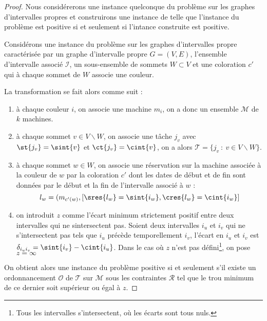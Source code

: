 \documentclass[a4paper,9pt]{book}
\begin{document}
\begin{proof}
    Nous considérerons une instance quelconque du problème \precolor sur les graphes d'intervalles
    propres et construirons une instance de \fischedpi telle que l'instance du problème \precolor
    est positive si et seulement si l'intance construite est positive.

    Considérons une instance du problème \precolor sur les graphes d'intervalles propre caractérisée
    par un graphe d'intervalle propre $G = (V,E)$, l'ensemble d'intervalle associé $\mathcal{I}$, un
    sous-ensemble de sommets $W \subset V$ et une coloration $c'$ qui à chaque sommet de $W$ associe
    une couleur. 
    
    La transformation se fait alors comme suit : 
    \begin{enumerate}
        \item à chaque couleur $i$, on associe une machine $m_i$, on a donc un ensemble
            $\mathcal{M}$ de $k$ machines.
        \item à chaque sommet $v \in V \backslash W$, on associe une tâche $j_v$ avec $\st{j_v} =
            \sint{v}$ et $\ct{j_v} = \cint{v}$, on a alors $\mathcal{T} = \{j_v\ \colon\ v \in V
            \backslash W\}$.
        \item à chaque sommet $w \in W$, on associe une réservation sur la machine associée à la
            couleur de $w$ par la coloration $c'$ dont les dates de début et de fin sont données par
            le début et la fin de l'intervalle associé à $w$ : \[
                l_w = (m_{c'(w)}, [\sres{l_w} = \sint{i_w}, \cres{l_w} = \cint{i_w}]
            \]
        \item on introduit $z$ comme l'écart minimum strictement positif entre deux intervalles qui
            ne sintersectent pas. Soient deux intervalles $i_u$ et $i_v$ qui ne s'intersectent pas
            tels que $i_u$ précède temporellement $i_v$, l'écart en $i_u$ et $i_v$ est
            $\delta_{i_ui_v} = \sint{i_v} - \cint{i_u}$. Dans le cas où $z$ n'est pas
            défini\footnote{Tous les intervalles s'intersectent, où les écarts sont tous nuls.}, on
            pose $z = \infty$
    \end{enumerate}

    On obtient alors une instance du problème \fischedpi positive si et seulement s'il existe un
    ordonnancement $\mathcal{O}$ de $\mathcal{T}$ sur $\mathcal{M}$ sous les contraintes
    $\mathcal{R}$ tel que le trou minimum de ce dernier soit supérieur ou égal à $z$.


\end{proof}
\end{document}
